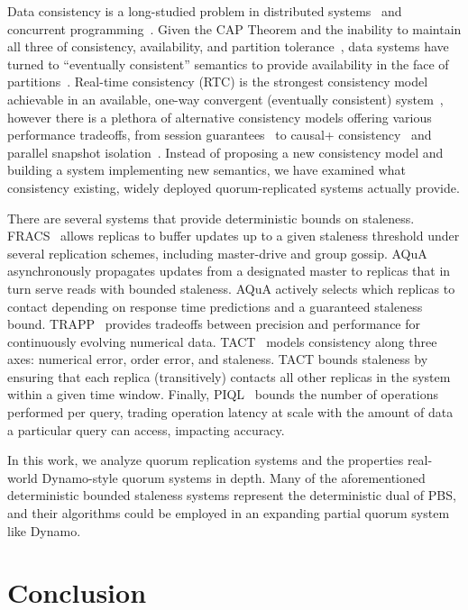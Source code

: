 \documentclass{vldb}
\newcommand{\sectionskip}{-0em}
\begin{document}
Data consistency is a long-studied problem in distributed
systems~\cite{consistency-partitioned, danger-rep} and concurrent
programming~\cite{linearizability}.  Given the CAP Theorem and the
inability to maintain all three of consistency, availability, and
partition tolerance~\cite{cap-proof}, data systems have turned to
``eventually consistent'' semantics to provide availability in the
face of partitions~\cite{consistency-partitioning, vogels-defs}.
Real-time consistency (RTC) is the strongest consistency model
achievable in an available, one-way convergent (eventually consistent)
system~\cite{rtc-proof}, however there is a plethora of alternative
consistency models offering various performance tradeoffs, from
session guarantees~\cite{sessionguarantees} to causal+
consistency~\cite{cops} and parallel snapshot isolation~\cite{walter}.
Instead of proposing a new consistency model and building a system
implementing new semantics, we have examined what consistency
existing, widely deployed quorum-replicated systems actually provide.

There are several systems that provide deterministic bounds on
staleness.  FRACS~\cite{frac} allows replicas to buffer updates up to
a given staleness threshold under several replication schemes,
including master-drive and group gossip.  AQuA~\cite{aqua}
asynchronously propagates updates from a designated master to replicas
that in turn serve reads with bounded staleness.  AQuA actively
selects which replicas to contact depending on response time
predictions and a guaranteed staleness bound.  TRAPP~\cite{trapp}
provides tradeoffs between precision and performance for continuously
evolving numerical data.  TACT~\cite{vahdat-article, vahdat-bounded}
models consistency along three axes: numerical error, order error, and
staleness.  TACT bounds staleness by ensuring that each replica
(transitively) contacts all other replicas in the system within a
given time window.  Finally, PIQL~\cite{piql} bounds the number of
operations performed per query, trading operation latency at scale
with the amount of data a particular query can access, impacting
accuracy.

In this work, we analyze quorum replication systems and the properties
real-world Dynamo-style quorum systems in depth.  Many of the
aforementioned deterministic bounded staleness systems represent the
deterministic dual of PBS, and their algorithms could be employed in
an expanding partial quorum system like Dynamo.

\vspace{\sectionskip}\section{Conclusion}
\label{sec:conclusion}
\end{document}
